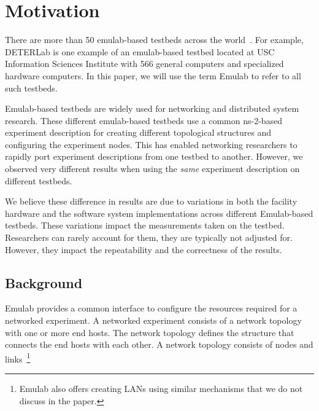 \section{Motivation}
\label{sec:motive}

There are more than 50 emulab-based testbeds across the world~\cite{EmulabWorld}. 
For example,  DETERLab is one example of an emulab-based testbed located 
 at USC Information Sciences Institute with 566 general computers and 
 specialized hardware computers. 
In this paper, we will use the term Emulab to refer to all 
 such testbeds.  
 
Emulab-based testbeds are widely used for networking and 
distributed system research. 
These different emulab-based testbeds 
 use a common ns-2-based experiment description for 
  creating different topological structures 
 and configuring the experiment nodes. 
This has 
 enabled networking researchers to rapidly port experiment descriptions 
  from one testbed to another. 
However, we observed very different results when 
 using the \emph{same} experiment description 
 on different testbeds. 
 
We believe these difference in results are due to variations in both the 
 facility hardware and the software system implementations across different 
 Emulab-based testbeds. 
These variations impact the measurements taken on the testbed. 
Researchers can rarely account for them, they are typically not adjusted for. 
However, they impact the repeatability and the correctness of the results. 
 
\subsection{Background} 
\label{sec:background}

Emulab provides a common interface to 
 configure the resources required for a networked experiment. 
A networked experiment consists of a network topology with 
 one or more end hosts. 
The network topology defines the structure that connects the end hosts with each other. 
A network topology consists of nodes and 
links~\footnote{Emulab also offers creating LANs 
 using similar mechanisms that we do not discuss in the paper.} 

